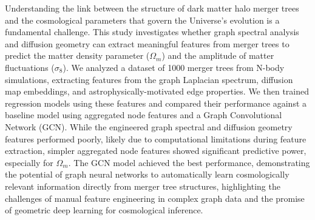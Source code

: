 \documentclass[twocolumn]{aastex631}
\begin{document}
Understanding the link between the structure of dark matter halo merger trees and the cosmological parameters that govern the Universe's evolution is a fundamental challenge. This study investigates whether graph spectral analysis and diffusion geometry can extract meaningful features from merger trees to predict the matter density parameter ($\Omega_m$) and the amplitude of matter fluctuations ($\sigma_8$). We analyzed a dataset of 1000 merger trees from N-body simulations, extracting features from the graph Laplacian spectrum, diffusion map embeddings, and astrophysically-motivated edge properties. We then trained regression models using these features and compared their performance against a baseline model using aggregated node features and a Graph Convolutional Network (GCN). While the engineered graph spectral and diffusion geometry features performed poorly, likely due to computational limitations during feature extraction, simpler aggregated node features showed significant predictive power, especially for $\Omega_m$. The GCN model achieved the best performance, demonstrating the potential of graph neural networks to automatically learn cosmologically relevant information directly from merger tree structures, highlighting the challenges of manual feature engineering in complex graph data and the promise of geometric deep learning for cosmological inference.
\
\end{document}
